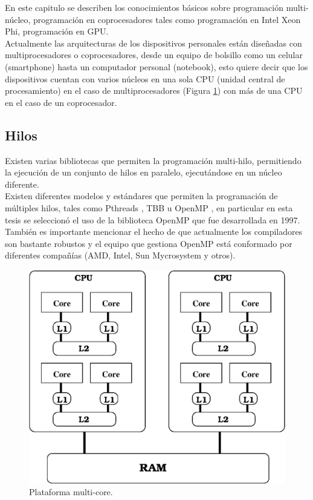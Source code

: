 En este capitulo se describen los conocimientos básicos sobre programación multi-núcleo, programación en coprocesadores tales como programación en Intel Xeon Phi, programación en GPU.\\
Actualmente las arquitecturas de los dispositivos personales están diseñadas con multiprocesadores o coprocesadores, desde un equipo de bolsillo como un celular (smartphone) hasta un computador personal (notebook), esto quiere decir que los dispositivos cuentan con varios núcleos en una sola CPU (unidad central de procesamiento) en el caso de multiprocesadores (Figura \ref{fig:plataforma}) con más de una CPU en el caso de un coprocesador.

\subsection{Hilos}
Existen varias bibliotecas que permiten la programación multi-hilo, permitiendo la ejecución de un conjunto de hilos en paralelo, ejecutándose en un núcleo diferente.\\
Existen diferentes modelos y estándares que permiten la programación de múltiples hilos, tales como Pthreads \cite{libroPthreads}, TBB \cite{libroTBB} u OpenMP \cite{libroOpenMP}, en particular en esta tesis se seleccionó el uso de la biblioteca OpenMP que fue desarrollada en 1997. También es importante mencionar el hecho de que actualmente los compiladores son bastante robustos y el equipo que gestiona OpenMP está conformado por diferentes compañías (AMD, Intel, Sun Mycrosystem y otros).\\

\begin{figure}
\begin{center}
   \includegraphics[scale=0.5]{fig/plataforma.eps}
\end{center}
\caption{\label{fig:plataforma}Plataforma multi-core.}
\end{figure}



